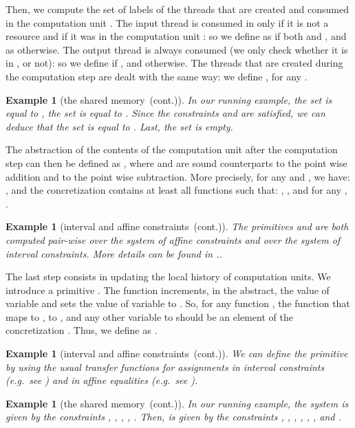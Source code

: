 \documentclass{article}
\newcommand{\boxexample}{}
\newtheorem{example}[thm]{Example}
\newcommand{\continued}{(cont.)}
\newcommand{\shareanalysis}{the shared memory}
\newcommand{\countdom}{interval and affine constraints}
\newcommand{\ccount}{\countdom\ \continued}
\newcommand{\ccontentanalysis}{\shareanalysis\ \continued}
\begin{document}
Then, we compute the set of labels of the threads that are created and consumed in the computation unit .
The input thread is consumed in  only if it is not a resource and if it was in the computation unit : so we define  as  if both    and , and as 
   otherwise. The output thread is always consumed (we only check whether it is in , or not): so we define  if , and 
  otherwise. The threads that are created during the computation step are dealt with the same way: we define , for any . 

\begin{example}[\ccontentanalysis]
In our running example, the set 
 is equal to , the set  is equal to . Since the constraints  and  are satisfied, we can deduce that the set  is equal to . Last, the set 
   is empty.
\boxexample\end{example}

The abstraction  of the contents of the computation unit  after the computation step can then be defined as , where  and  are sound counterparts to the point wise addition and to the point wise subtraction. More precisely, for any  and , we have: 
, and the concretization  contains at least all functions  such that: , , and for any , . 

\begin{example}[\ccount]
\hspace*{-1mm}The primitives  and   are both computed pair-wise over the system of affine constraints and over the system of interval constraints. More details can be found in \cite[Chap.~9,\;Sect.~9.3.1]{feret:thesis}..
\boxexample\end{example}

The last step consists in updating the local history of computation units. 
We introduce a primitive . The function  increments, in the abstract, the value of variable  and sets the value of variable  to . So, for any function , the function  that maps  to ,  to , and any other variable  to  should be an element of the concretization . Thus, we define  as . 

\begin{example}[\ccount]
We can define the primitive  by using the usual transfer functions for assignments in interval constraints (e.g.~see \cite{cc76}) and in affine equalities (e.g.~see \cite{karr}).
\boxexample\end{example}

\begin{example}[\ccontentanalysis]
In our running example, the system 
 is given by the constraints , ,  , 
, .  
Then,  is given by the constraints 
, ,  , 
, , , and .
\boxexample\end{example}
\end{document}
